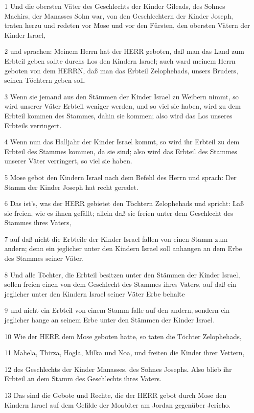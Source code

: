 \par 1 Und die obersten Väter des Geschlechts der Kinder Gileads, des Sohnes Machirs, der Manasses Sohn war, von den Geschlechtern der Kinder Joseph, traten herzu und redeten vor Mose und vor den Fürsten, den obersten Vätern der Kinder Israel,
\par 2 und sprachen: Meinem Herrn hat der HERR geboten, daß man das Land zum Erbteil geben sollte durchs Los den Kindern Israel; auch ward meinem Herrn geboten von dem HERRN, daß man das Erbteil Zelophehads, unsers Bruders, seinen Töchtern geben soll.
\par 3 Wenn sie jemand aus den Stämmen der Kinder Israel zu Weibern nimmt, so wird unserer Väter Erbteil weniger werden, und so viel sie haben, wird zu dem Erbteil kommen des Stammes, dahin sie kommen; also wird das Los unseres Erbteils verringert.
\par 4 Wenn nun das Halljahr der Kinder Israel kommt, so wird ihr Erbteil zu dem Erbteil des Stammes kommen, da sie sind; also wird das Erbteil des Stammes unserer Väter verringert, so viel sie haben.
\par 5 Mose gebot den Kindern Israel nach dem Befehl des Herrn und sprach: Der Stamm der Kinder Joseph hat recht geredet.
\par 6 Das ist's, was der HERR gebietet den Töchtern Zelophehads und spricht: Laß sie freien, wie es ihnen gefällt; allein daß sie freien unter dem Geschlecht des Stammes ihres Vaters,
\par 7 auf daß nicht die Erbteile der Kinder Israel fallen von einen Stamm zum andern; denn ein jeglicher unter den Kindern Israel soll anhangen an dem Erbe des Stammes seiner Väter.
\par 8 Und alle Töchter, die Erbteil besitzen unter den Stämmen der Kinder Israel, sollen freien einen von dem Geschlecht des Stammes ihres Vaters, auf daß ein jeglicher unter den Kindern Israel seiner Väter Erbe behalte
\par 9 und nicht ein Erbteil von einem Stamm falle auf den andern, sondern ein jeglicher hange an seinem Erbe unter den Stämmen der Kinder Israel.
\par 10 Wie der HERR dem Mose geboten hatte, so taten die Töchter Zelophehads,
\par 11 Mahela, Thirza, Hogla, Milka und Noa, und freiten die Kinder ihrer Vettern,
\par 12 des Geschlechts der Kinder Manasses, des Sohnes Josephs. Also blieb ihr Erbteil an dem Stamm des Geschlechts ihres Vaters.
\par 13 Das sind die Gebote und Rechte, die der HERR gebot durch Mose den Kindern Israel auf dem Gefilde der Moabiter am Jordan gegenüber Jericho.


